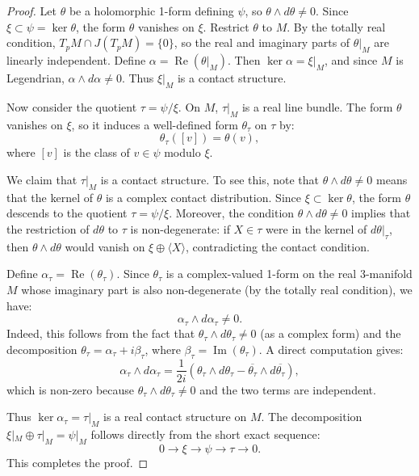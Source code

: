 \documentclass{amsart}
\begin{document}
\begin{proof}
Let $\theta$ be a holomorphic 1-form defining $\psi$, so $\theta \wedge d\theta \neq 0$. Since $\xi \subset \psi = \ker \theta$, the form $\theta$ vanishes on $\xi$. Restrict $\theta$ to $M$. By the totally real condition, $T_pM \cap J(T_pM) = \{0\}$, so the real and imaginary parts of $\theta|_M$ are linearly independent. Define $\alpha = \operatorname{Re}(\theta|_M)$. Then $\ker \alpha = \xi|_M$, and since $M$ is Legendrian, $\alpha \wedge d\alpha \neq 0$. Thus $\xi|_M$ is a contact structure.

Now consider the quotient $\tau = \psi / \xi$. On $M$, $\tau|_M$ is a real line bundle. The form $\theta$ vanishes on $\xi$, so it induces a well-defined form $\theta_\tau$ on $\tau$ by:
\[
\theta_\tau([v]) = \theta(v),
\]
where $[v]$ is the class of $v \in \psi$ modulo $\xi$.

We claim that $\tau|_M$ is a contact structure. To see this, note that $\theta \wedge d\theta \neq 0$ means that the kernel of $\theta$ is a complex contact distribution. Since $\xi \subset \ker \theta$, the form $\theta$ descends to the quotient $\tau = \psi / \xi$. Moreover, the condition $\theta \wedge d\theta \neq 0$ implies that the restriction of $d\theta$ to $\tau$ is non-degenerate: if $X \in \tau$ were in the kernel of $d\theta|_\tau$, then $\theta \wedge d\theta$ would vanish on $\xi \oplus \langle X \rangle$, contradicting the contact condition.

Define $\alpha_\tau = \operatorname{Re}(\theta_\tau)$. Since $\theta_\tau$ is a complex-valued 1-form on the real 3-manifold $M$ whose imaginary part is also non-degenerate (by the totally real condition), we have:
\[
\alpha_\tau \wedge d\alpha_\tau \neq 0.
\]
Indeed, this follows from the fact that $\theta_\tau \wedge d\theta_\tau \neq 0$ (as a complex form) and the decomposition $\theta_\tau = \alpha_\tau + i\beta_\tau$, where $\beta_\tau = \operatorname{Im}(\theta_\tau)$. A direct computation gives:
\[
\alpha_\tau \wedge d\alpha_\tau = \frac{1}{2i} \left( \theta_\tau \wedge d\theta_\tau - \overline{\theta_\tau} \wedge d\overline{\theta_\tau} \right),
\]
which is non-zero because $\theta_\tau \wedge d\theta_\tau \neq 0$ and the two terms are independent.

Thus $\ker \alpha_\tau = \tau|_M$ is a real contact structure on $M$. The decomposition $\xi|_M \oplus \tau|_M = \psi|_M$ follows directly from the short exact sequence:
\[
0 \to \xi \to \psi \to \tau \to 0.
\]
This completes the proof.
\end{proof}
\end{document}
